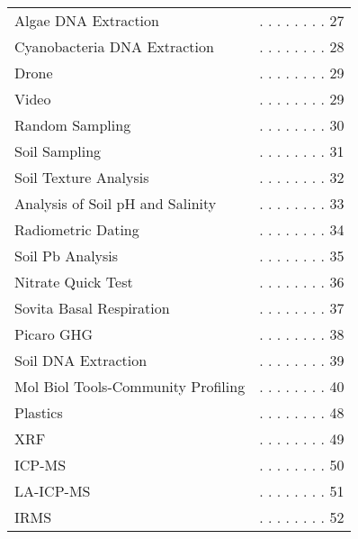 \documentclass[18pt]{memoir}\usepackage[]{graphicx}\usepackage[]{color}
\begin{document}
\begin{table}[ht]
\begin{tabular}{ll}
  Algae DNA Extraction & . . . . . . . .  27 \\ 
  Cyanobacteria DNA Extraction & . . . . . . . .  28 \\ 
  Drone & . . . . . . . .  29 \\ 
   Video & . . . . . . . .  29 \\ 
  Random Sampling & . . . . . . . .  30 \\ 
  Soil Sampling & . . . . . . . .  31 \\ 
  Soil Texture Analysis & . . . . . . . .  32 \\ 
  Analysis of Soil pH and Salinity & . . . . . . . .  33 \\ 
  Radiometric Dating & . . . . . . . .  34 \\ 
  Soil Pb Analysis & . . . . . . . .  35 \\ 
  Nitrate Quick Test & . . . . . . . .  36 \\ 
  Sovita Basal Respiration & . . . . . . . .  37 \\ 
  Picaro GHG & . . . . . . . .  38 \\ 
  Soil DNA Extraction & . . . . . . . .  39 \\ 
  Mol Biol Tools-Community Profiling & . . . . . . . .  40 \\ 
  Plastics & . . . . . . . .  48 \\ 
  XRF & . . . . . . . .  49 \\ 
  ICP-MS & . . . . . . . .  50 \\ 
  LA-ICP-MS & . . . . . . . .  51 \\ 
  IRMS & . . . . . . . .  52 \\ 
   \bottomrule
\end{tabular}
\end{table}
\end{document}
